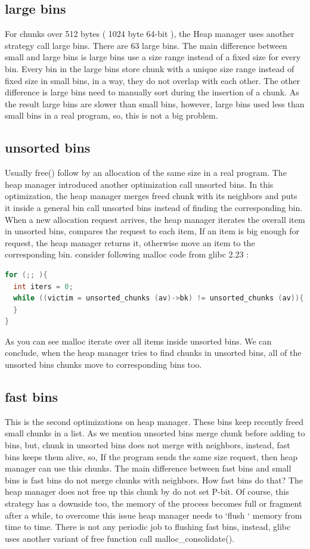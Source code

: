 \documentclass{masterthesis}
\newcommand*\libc{glibc}
\newcommand*\fb{fast bins}
\newcommand*\ub{unsorted bins}
\newcommand*\lb{large bins}
\newcommand*\sbs{small bins}
\begin{document}
\subsection{\lb{}}
For chunks over 512 bytes ( 1024 byte 64-bit ), the Heap manager uses another strategy call \lb{}. There are 63 \lb{}. The main difference between small and \lb{} is \lb{} use a size range instead of a fixed size for every bin. Every bin in the \lb{} store chunk with a unique size range instead of fixed size in \sbs{}, in a way, they do not overlap with each other.
The other difference is \lb{} need to manually sort during the insertion of a chunk. As the result \lb{} are slower than \sbs{}, however, \lb{} used less than \sbs{} in a real program, so, this is not a big problem.

\subsection{\ub{}}
Usually free() follow by an allocation of the same size in a real program. The heap manager introduced another optimization call \ub{}. In this optimization, the heap manager merges freed chunk with its neighbors and puts it inside a general bin call \ub{} instead of finding the corresponding bin. When a new allocation request arrives, the heap manager iterates the overall item in \ub{}, compares the request to each item, If an item is big enough for request, the heap manager returns it, otherwise move an item to the corresponding bin. consider following malloc code from \libc{} 2.23 :
\begin{lstlisting}[language=c,frame=tlrb]
for (;; ){
  int iters = 0;
  while ((victim = unsorted_chunks (av)->bk) != unsorted_chunks (av)){
  }
}
\end{lstlisting}
As you can see malloc iterate over all items inside \ub{}. We can conclude, when the heap manager tries to find chunks in \ub{}, all of the \ub{} chunks move to corresponding bins too.

\subsection{\fb{}}
This is the second optimizations on heap manager. These bins keep recently freed small chunks in a list. As we mention \ub{} merge chunk before adding to bins, but, chunk in \ub{} does not merge with neighbors, instead, \fb{} keeps them alive, so, If the program sends the same size request, then heap manager can use this chunks.
The main difference between \fb{} and \sbs{} is \fb{} do not merge chunks with neighbors. How \fb{} do that? The heap manager does not free up this chunk by do not set P-bit. Of course, this strategy has a downside too, the memory of the process becomes full or fragment after a while, to overcome this issue heap manager needs to ‘flush ‘ memory from time to time. There is not any periodic job to flushing \fb{}, instead, \libc{} uses another variant of free function call malloc\_consolidate(). 
\end{document}
